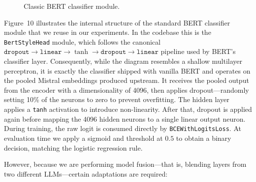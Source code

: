 \documentclass[12pt]{article}
\begin{document}
\begin{figure}[htbp]
\begin{adjustwidth}{-0.3cm}{0cm}
\begin{minipage}{1\textwidth}
\end{minipage}
\end{adjustwidth}
\caption{Classic BERT classifier module.}
\label{fig:bert-classifier-module}
\end{figure}

Figure~10 illustrates the internal structure of the standard BERT classifier module that we reuse in our experiments. 
In the codebase this is the \texttt{BertStyleHead} module, which follows the canonical $\texttt{dropout} \rightarrow \texttt{linear} \rightarrow \tanh \rightarrow \texttt{dropout} \rightarrow \texttt{linear}$ pipeline used by BERT's classifier layer. 
Consequently, while the diagram resembles a shallow multilayer perceptron, it is exactly the classifier shipped with vanilla BERT and operates on the pooled Mistral embeddings produced upstream.
It receives the pooled output from the encoder with a dimensionality of 4096, then applies dropout\;---\;randomly setting 10\% of the neurons to zero to prevent overfitting. 
The hidden layer applies a \texttt{tanh} activation to introduce non-linearity. 
After that, dropout is applied again before mapping the 4096 hidden neurons to a single linear output neuron. 
During training, the raw logit is consumed directly by \texttt{BCEWithLogitsLoss}. 
At evaluation time we apply a sigmoid and threshold at $0.5$ to obtain a binary decision, matching the logistic regression rule.

However, because we are performing model fusion\;---\;that is, blending layers from two different LLMs\;---\;certain adaptations are required:
\end{document}
